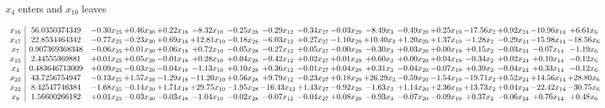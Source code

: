\documentclass[9pt]{article}
\begin{document}
 $ x_{4} $ enters and $ x_{10} $ leaves 

 \[\begin{array}{c| c c@{\hskip 2pt} c@{\hskip 2pt} c@{\hskip 2pt} c@{\hskip 2pt} c@{\hskip 2pt} c@{\hskip 2pt} c@{\hskip 2pt} c@{\hskip 2pt} c@{\hskip 2pt} c@{\hskip 2pt} c@{\hskip 2pt} c@{\hskip 2pt} c@{\hskip 2pt} c@{\hskip 2pt} c@{\hskip 2pt} }
 x_{16}   &  56.0350374349 & -0.30 x_{25} & +  0.46 x_{30} & +  0.22 x_{18} & -8.32 x_{10} & -0.25 x_{28} & -0.29 x_{12} & -0.34 x_{27} & -0.03 x_{29} & -8.49 x_{3} & -0.49 x_{20} & +  0.25 x_{19} & -17.56 x_{2} & +  0.92 x_{24} & -10.96 x_{14} & +  6.61 x_{6}\\
 x_{17}   &  22.8534464342 & -0.77 x_{25} & -0.23 x_{30} & +  0.69 x_{18} & + 12.81 x_{10} & -0.18 x_{28} & -6.03 x_{12} & +  0.27 x_{27} & -1.10 x_{29} & + 10.40 x_{3} & +  1.20 x_{20} & +  1.37 x_{19} & -1.28 x_{2} & -0.29 x_{24} & -15.98 x_{14} & -18.56 x_{6}\\
 x_{7}   &  0.907369368348 & -0.06 x_{25} & +  0.01 x_{30} & +  0.06 x_{18} & +  0.72 x_{10} & -0.05 x_{28} & -0.27 x_{12} & +  0.05 x_{27} & -0.00 x_{29} & -0.30 x_{3} & +  0.03 x_{20} & +  0.00 x_{19} & +  0.15 x_{2} & -0.03 x_{24} & -0.07 x_{14} & -1.19 x_{6}\\
 x_{15}   &  2.44555369881 & +  0.01 x_{25} & +  0.05 x_{30} & -0.01 x_{18} & +  0.28 x_{10} & +  0.04 x_{28} & -0.42 x_{12} & +  0.02 x_{27} & +  0.01 x_{29} & +  0.60 x_{3} & +  0.00 x_{20} & +  0.04 x_{19} & -0.34 x_{2} & +  0.02 x_{24} & +  0.10 x_{14} & -0.12 x_{6}\\
 x_{4}   &  0.483646713009 & +  0.09 x_{25} & -0.03 x_{30} & -0.04 x_{18} & -1.13 x_{10} & +  0.10 x_{28} & +  0.36 x_{12} & -0.01 x_{27} & +  0.04 x_{29} & +  0.31 x_{3} & -0.04 x_{20} & -0.07 x_{19} & +  0.39 x_{2} & -0.04 x_{24} & +  0.33 x_{14} & -0.12 x_{6}\\
 x_{23}   &  43.7256754947 & -0.13 x_{25} & +  1.57 x_{30} & -1.29 x_{18} & -11.20 x_{10} & +  0.56 x_{28} & +  9.79 x_{12} & -0.23 x_{27} & +  0.18 x_{29} & + 26.29 x_{3} & -0.59 x_{20} & -1.54 x_{19} & -19.71 x_{2} & +  0.52 x_{24} & + 14.56 x_{14} & + 28.80 x_{6}\\
 x_{22}   &  8.42547746384 & -1.68 x_{25} & -0.14 x_{30} & +  1.71 x_{18} & + 29.75 x_{10} & -1.95 x_{28} & -16.43 x_{12} & +  1.43 x_{27} & -0.92 x_{29} & -1.63 x_{3} & +  1.14 x_{20} & +  2.36 x_{19} & + 13.73 x_{2} & +  0.04 x_{24} & -22.42 x_{14} & -30.75 x_{6}\\
 x_{9}   &  1.56600266182 & +  0.01 x_{25} & -0.03 x_{30} & -0.03 x_{18} & -1.04 x_{10} & -0.02 x_{28} & -0.07 x_{12} & -0.04 x_{27} & +  0.08 x_{29} & -0.93 x_{3} & -0.07 x_{20} & -0.09 x_{19} & +  0.37 x_{2} & -0.06 x_{24} & +  0.76 x_{14} & +  0.48 x_{6}\\

\end{array}\]
\end{document}
